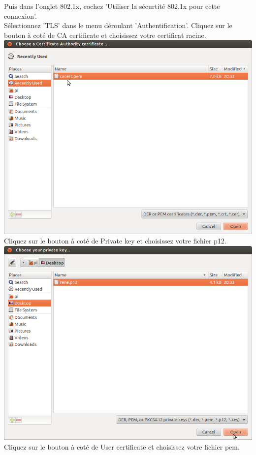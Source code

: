 Puis dans l'onglet 802.1x, cochez 'Utiliser la sécurtité 802.1x pour cette connexion'.\\
Sélectionnez 'TLS' dans le menu déroulant 'Authentification'. 
Cliquez sur le bouton à coté de CA certificate et choisissez votre certificat racine.\\
\includegraphics[width=\screenShotSize{}]{img/selectCacert.png}\\
Cliquez sur le bouton à coté de Private key et choisissez votre fichier p12.\\
\includegraphics[width=\screenShotSize{}]{img/selectP12.png}\\
Cliquez sur le bouton à coté de User certificate et choisissez votre fichier pem.\\
